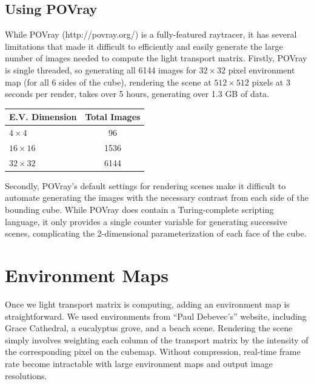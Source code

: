 \documentclass[11pt]{article}
\begin{document}
\subsection{Using POVray}

While POVray (http://povray.org/) is a fully-featured raytracer, it has several
limitations that made it difficult to efficiently and easily generate the large
number of images needed to compute the light transport matrix. Firstly, POVray
is single threaded, so generating all 6144 images for $32\times 32$ pixel
environment map (for all 6 sides of the cube), rendering the scene at
$512\times 512$ pixels at 3 seconds per render, takes over 5 hours, generating
over 1.3 GB of data.

\begin{center}
\begin{tabular}{|l|c|}
 \hline
 E.V. Dimension & Total Images\\
 \hline
 $4\times 4$ & 96 \\
 $16\times 16$ & 1536 \\
 $32\times 32$ & 6144 \\
 \hline
\end{tabular}
\end{center}

Secondly, POVray's default settings for rendering scenes make it difficult to
automate generating the images with the necessary contrast from each side of
the bounding cube. While POVray does contain a Turing-complete scripting
language, it only provides a single counter variable for generating successive
scenes, complicating the 2-dimensional parameterization of each face of the
cube.

\section{Environment Maps}

Once we light transport matrix is computing, adding an environment map is
straightforward. We used environments from ``Paul Debevec's'' website,
including Grace Cathedral, a eucalyptus grove, and a beach scene. Rendering the
scene simply involves weighting each column of the transport matrix by the
intensity of the corresponding pixel on the cubemap. Without compression,
real-time frame rate become intractable with large environment maps and output
image resolutions.
\end{document}
